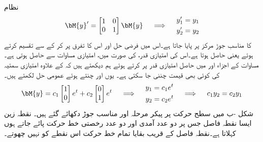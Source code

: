 نظام 
\begin{gather}\label{مساوات_نظام_مناسب_جوڑ}
\begin{aligned}
\bM{y}'=\begin{bmatrix} 1 & 0 \\ 0 &1 \end{bmatrix} \bM{y}
\end{aligned}\quad \implies \quad 
\begin{aligned} 
y_1'&=y_1\\
y_2'&=y_2
\end{aligned}
\end{gather}
کا مناسب جوڑ مرکز پر پایا جاتا ہے۔اس میں فرضی حل  اور اس کا تفرق  پر کر کے  سے تقسیم کرتے ہوئے   یعنی  حاصل ہوتا ہے۔اس کی امتیازی قدر،  کی صورت میں، امتیازی مساوات  سے    حاصل ہوتی ہے۔مساوات  کے اجزاء   اور  میں حاصل امتیازی قدر پر کرتے ہوئے ہم دیکھتے ہیں کہ  کے علاوہ امتیازی سمتیہ  کی کوئی بھی قیمت چننی جا سکتی ہے۔ یوں  اور  چنتے ہوئے عمومی حل لکھتے ہیں۔
\begin{gather*}
\begin{aligned}
\bM{y}=c_1\begin{bmatrix}1 \\ 0  \end{bmatrix} e^{t} +c_2\begin{bmatrix} 0 \\ 1 \end{bmatrix} e^{t}
\end{aligned}\quad \implies \quad
\begin{aligned}
y_1&=c_1e^t\\
y_2&=c_2e^t
\end{aligned} \quad \implies \quad
\begin{aligned}
c_1y_2=c_2y_1
\end{aligned}
\end{gather*} 
شکل -ب میں سطح حرکت پر پیکر مرحلہ اور مناسب جوڑ دکھائے گئے ہیں۔ 
\quad نقطہ زین\\
ایسا نقطہ فاصل  جس پر دو عدد آمدی اور دو عدد رخصتی خط حرکت پائے جاتے ہوں   کہلاتا ہے۔نقطہ فاصل کے قریب بقایا تمام خط حرکت اس نقطے کو نہیں چھوتے۔

